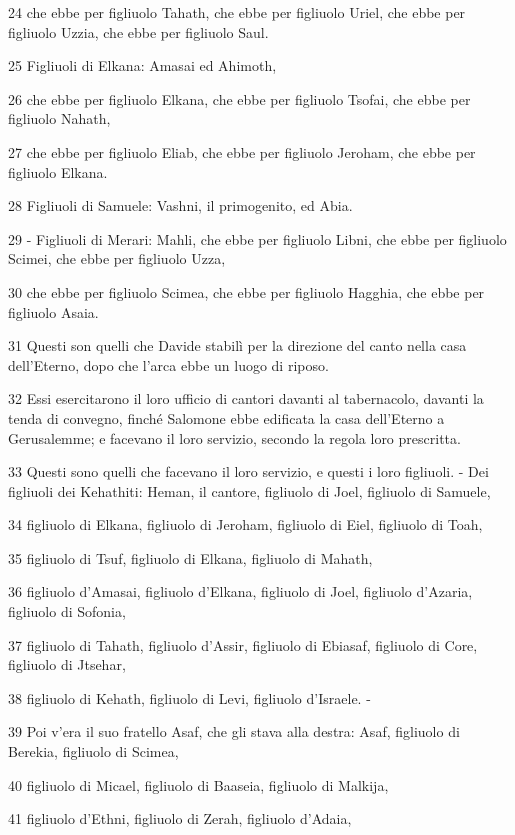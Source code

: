 \par 24 che ebbe per figliuolo Tahath, che ebbe per figliuolo Uriel, che ebbe per figliuolo Uzzia, che ebbe per figliuolo Saul.
\par 25 Figliuoli di Elkana: Amasai ed Ahimoth,
\par 26 che ebbe per figliuolo Elkana, che ebbe per figliuolo Tsofai, che ebbe per figliuolo Nahath,
\par 27 che ebbe per figliuolo Eliab, che ebbe per figliuolo Jeroham, che ebbe per figliuolo Elkana.
\par 28 Figliuoli di Samuele: Vashni, il primogenito, ed Abia.
\par 29 - Figliuoli di Merari: Mahli, che ebbe per figliuolo Libni, che ebbe per figliuolo Scimei, che ebbe per figliuolo Uzza,
\par 30 che ebbe per figliuolo Scimea, che ebbe per figliuolo Hagghia, che ebbe per figliuolo Asaia.
\par 31 Questi son quelli che Davide stabilì per la direzione del canto nella casa dell'Eterno, dopo che l'arca ebbe un luogo di riposo.
\par 32 Essi esercitarono il loro ufficio di cantori davanti al tabernacolo, davanti la tenda di convegno, finché Salomone ebbe edificata la casa dell'Eterno a Gerusalemme; e facevano il loro servizio, secondo la regola loro prescritta.
\par 33 Questi sono quelli che facevano il loro servizio, e questi i loro figliuoli. - Dei figliuoli dei Kehathiti: Heman, il cantore, figliuolo di Joel, figliuolo di Samuele,
\par 34 figliuolo di Elkana, figliuolo di Jeroham, figliuolo di Eiel, figliuolo di Toah,
\par 35 figliuolo di Tsuf, figliuolo di Elkana, figliuolo di Mahath,
\par 36 figliuolo d'Amasai, figliuolo d'Elkana, figliuolo di Joel, figliuolo d'Azaria, figliuolo di Sofonia,
\par 37 figliuolo di Tahath, figliuolo d'Assir, figliuolo di Ebiasaf, figliuolo di Core, figliuolo di Jtsehar,
\par 38 figliuolo di Kehath, figliuolo di Levi, figliuolo d'Israele. -
\par 39 Poi v'era il suo fratello Asaf, che gli stava alla destra: Asaf, figliuolo di Berekia, figliuolo di Scimea,
\par 40 figliuolo di Micael, figliuolo di Baaseia, figliuolo di Malkija,
\par 41 figliuolo d'Ethni, figliuolo di Zerah, figliuolo d'Adaia,
